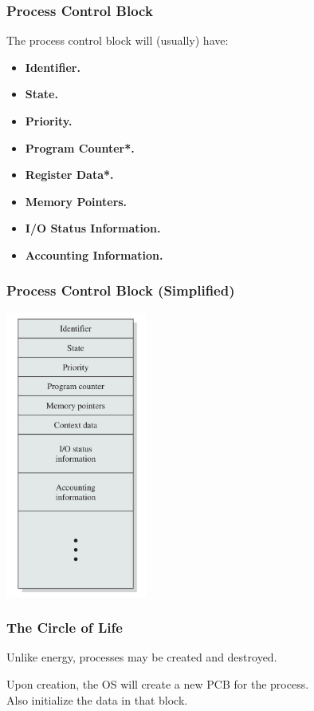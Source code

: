 \begin{frame}
	\frametitle{Process Control Block}

	The process control block will (usually) have:
	\begin{itemize}
		\item \textbf{Identifier.}
		\item \textbf{State.}
		\item \textbf{Priority.}
		\item \textbf{Program Counter*.}
		\item \textbf{Register Data*.}
		\item \textbf{Memory Pointers.}
		\item \textbf{I/O Status Information.}
		\item \textbf{Accounting Information.}
	\end{itemize}

\end{frame}

\begin{frame}
	\frametitle{Process Control Block (Simplified)}

	\begin{center}
		\includegraphics[width=0.35\textwidth]{images/pcb.png}
	\end{center}

\end{frame}

\begin{frame}
	\frametitle{The Circle of Life}


	Unlike energy, processes may be created and destroyed.

	Upon creation, the OS will create a new PCB for the process.\\
	\quad Also initialize the data in that block.
	
\end{frame}

